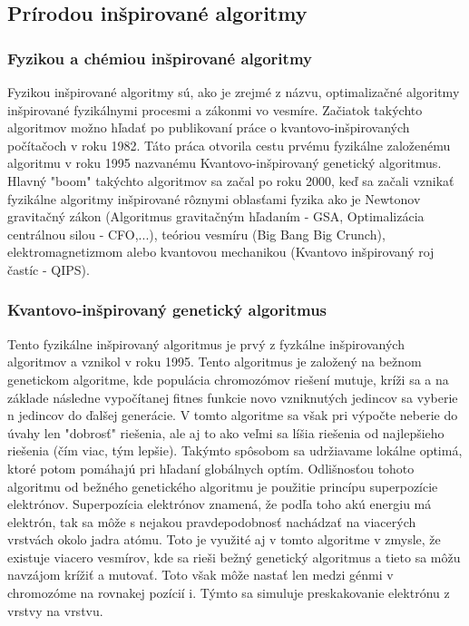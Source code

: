 \subsection{Prírodou inšpirované algoritmy}
\subsubsection{Fyzikou a chémiou inšpirované algoritmy}\label{fyz_chem_algo}
Fyzikou inšpirované algoritmy sú, ako je zrejmé z názvu, optimalizačné algoritmy inšpirované fyzikálnymi procesmi a zákonmi vo vesmíre. Začiatok takýchto algoritmov možno hľadať po publikovaní práce o kvantovo-inšpirovaných počítačoch v roku 1982\cite{QMechComp}. Táto práca otvorila cestu prvému fyzikálne založenému algoritmu v roku 1995 nazvanému Kvantovo-inšpirovaný genetický algoritmus\cite{QIGA}. Hlavný "boom" takýchto algoritmov sa začal po roku 2000, keď sa začali vznikať fyzikálne algoritmy inšpirované rôznymi oblasťami fyzika ako je Newtonov gravitačný zákon (Algoritmus gravitačným hľadaním - GSA, Optimalizácia centrálnou silou - CFO,...), teóriou vesmíru (Big Bang Big Crunch), elektromagnetizmom  alebo kvantovou mechanikou (Kvantovo inšpirovaný roj častíc - QIPS).\cite{PhysicsSurvey}
\subsubsection*{Kvantovo-inšpirovaný genetický algoritmus}
Tento fyzikálne inšpirovaný algoritmus je prvý z fyzkálne inšpirovaných algoritmov a vznikol v roku 1995. Tento algoritmus je založený  na bežnom genetickom algoritme, kde populácia chromozómov riešení mutuje, kríži sa a na základe následne vypočítanej fitnes funkcie novo vzniknutých jedincov sa vyberie n jedincov do ďalšej generácie. V tomto algoritme sa však pri výpočte neberie do úvahy len "dobrosť" riešenia, ale aj to ako veľmi sa líšia riešenia od najlepšieho riešenia (čím viac, tým lepšie). Takýmto spôsobom sa udržiavame lokálne optimá, ktoré potom pomáhajú pri hľadaní globálnych optím.
Odlišnosťou tohoto algoritmu od bežného genetického algoritmu je použitie princípu superpozície elektrónov. Superpozícia elektrónov znamená, že podľa toho akú energiu má elektrón, tak sa môže s nejakou pravdepodobnosť nachádzať na viacerých vrstvách okolo jadra atómu. Toto je využité aj v tomto algoritme v zmysle, že existuje viacero vesmírov, kde sa rieši bežný genetický algoritmus a tieto sa môžu navzájom krížiť a mutovať. Toto však môže nastať len medzi génmi v chromozóme na rovnakej pozícií i. Týmto sa simuluje preskakovanie elektrónu z vrstvy na vrstvu\cite{QIGA}.
